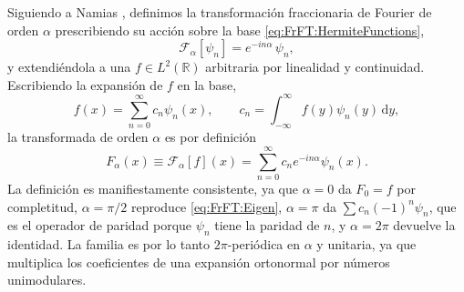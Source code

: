 			Siguiendo a Namias \citeyearpar{namias1980fractional}, definimos la transformación fraccionaria de Fourier de orden $\alpha$ prescribiendo su acción sobre la base \eqref{eq:FrFT:HermiteFunctions},
			\begin{equation}\label{eq:FrFT:SpectralDef}
				\mathcal{F}_{\alpha}\left[\psi_{n}\right] = e^{-in\alpha}\,\psi_{n},
			\end{equation}
			y extendiéndola a una $f\in L^{2}(\mathbb{R})$ arbitraria por linealidad y continuidad. Escribiendo la expansión de $f$ en la base,
			\begin{equation}\label{eq:FrFT:Expansion}
				f(x) = \sum_{n=0}^{\infty}c_{n}\psi_{n}(x), \qquad c_{n} = \int_{-\infty}^{\infty}f(y)\psi_{n}(y)\,\mathrm{d}y,
			\end{equation}
			la transformada de orden $\alpha$ es por definición
			\begin{equation}\label{eq:FrFT:SpectralTransform}
				F_{\alpha}(x) \equiv \mathcal{F}_{\alpha}\left[f\right](x) = \sum_{n=0}^{\infty}c_{n}e^{-in\alpha}\psi_{n}(x).
			\end{equation}
			La definición es manifiestamente consistente, ya que $\alpha = 0$ da $F_{0} = f$ por completitud, $\alpha = \pi/2$ reproduce \eqref{eq:FrFT:Eigen}, $\alpha = \pi$ da $\sum c_{n}(-1)^{n}\psi_{n}$, que es el operador de paridad porque $\psi_{n}$ tiene la paridad de $n$, y $\alpha = 2\pi$ devuelve la identidad. La familia es por lo tanto $2\pi$-periódica en $\alpha$ y unitaria, ya que multiplica los coeficientes de una expansión ortonormal por números unimodulares.

